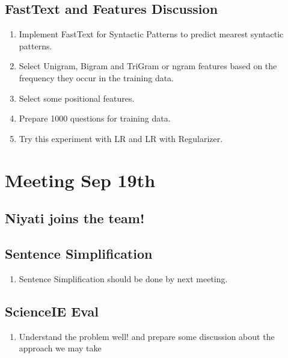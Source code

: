 \documentclass[11pt]{article}
\begin{document}
\subsection{FastText and Features Discussion}
\begin{enumerate}
\item Implement FastText for Syntactic Patterns to predict mearest syntactic patterns.
\item Select Unigram, Bigram and TriGram or ngram features based on the frequency they occur in the training data.
\item Select some positional features.
\item Prepare 1000 questions for training data.
\item Try this experiment with LR and LR with Regularizer.
\end{enumerate}

\section{Meeting Sep 19th}
\subsection{Niyati joins the team!}
\subsection{Sentence Simplification}
\begin{enumerate}
\item Sentence Simplification should be done by next meeting.
\end{enumerate}
\subsection{ScienceIE Eval}
\begin{enumerate}
\item{Understand the problem well! and prepare some discussion about the approach we may take}
\end{enumerate}
\end{document}
